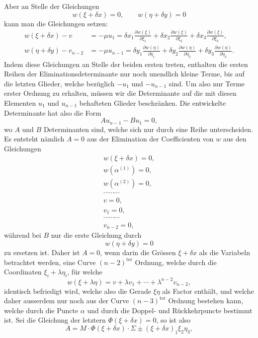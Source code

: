 \documentclass[10pt]{article}
\begin{document}
Aber an Stelle der Gleichungen
\[
w(\xi+\delta x)=0,\qquad w(\eta+\delta y)=0
\]
kann man die Gleichungen setzen:
\[
\begin{aligned}
w(\xi+\delta x)-v&=-\mu u_1
=\delta x_1\frac{\partial w(\xi)}{\partial\xi_1}
+\delta x_2\frac{\partial w(\xi)}{\partial\xi_2}
+\delta x_3\frac{\partial w(\xi)}{\partial\xi_3},\\
w(\eta+\delta y)-v_{n-2}&=-\mu u_{n-1}
=\delta y_1\frac{\partial w(\eta)}{\partial\eta_1}
+\delta y_2\frac{\partial w(\eta)}{\partial\eta_2}
+\delta y_3\frac{\partial w(\eta)}{\partial\eta_3}.
\end{aligned}
\]
Indem diese Gleichungen an Stelle der beiden ersten treten, enthalten die ersten Reihen der Eliminationsdeterminante nur noch unendlich kleine Terme, bis auf die letzten Glieder, welche bezüglich \(-u_1\) und \(-u_{n-1}\) sind. Um also nur Terme erster Ordnung zu erhalten, müssen wir die Determinante auf die mit diesen Elementen \(u_1\) und \(u_{n-1}\) behafteten Glieder beschränken. Die entwickelte Determinante hat also die Form
\[
Au_{n-1}-Bu_1=0,
\]
wo \(A\) und \(B\) Determinanten sind, welche sich nur durch eine Reihe unterscheiden. Es entsteht nämlich \(A=0\) aus der Elimination der Coefficienten von \(w\) aus den Gleichungen
\[
\begin{array}{c}
w(\xi+\delta x)=0,\\
w(\alpha^{(1)})=0,\\
w(\alpha^{(2)})=0,\\[-0.3em]
\cdots\cdots\cdots\\[-0.3em]
v=0,\\
v_1=0,\\[-0.3em]
\cdots\cdots\cdots\\[-0.3em]
v_{n-2}=0,
\end{array}
\]
während bei \(B\) nur die erste Gleichung durch
\[
w(\eta+\delta y)=0
\]
zu ersetzen ist. Daher ist \(A=0\), wenn darin die Grössen \(\xi+\delta x\) als die Variabeln betrachtet werden, eine Curve \((n-2)^{\mathrm{ter}}\) Ordnung, welche durch die Coordinaten \(\xi_i+\lambda\eta_i\), für welche
\[
w(\xi+\lambda\eta)=v+\lambda v_1+\cdots+\lambda^{n-2}v_{n-2},
\]
identisch befriedigt wird, welche also die Gerade \(\xi\eta\) als Factor enthält, und welche daher ausserdem nur noch aus der Curve \((n-3)^{\mathrm{ter}}\) Ordnung bestehen kann, welche durch die Puncte \(\alpha\) und durch die Doppel- und Rückkehrpuncte bestimmt ist. Sei die Gleichung der letztern \(\Phi(\xi+\delta x)=0\), so ist also
\[
A=M\cdot\Phi(\xi+\delta x)\cdot\Sigma\pm(\xi+\delta x)_1\xi_2\eta_3,
\]
\end{document}
